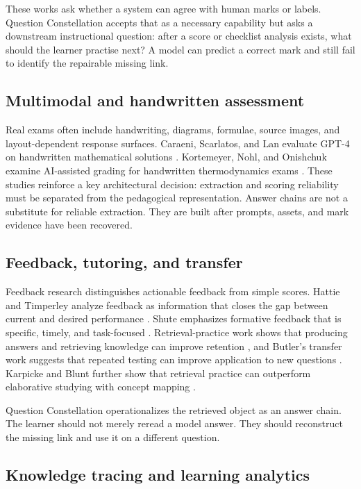 \documentclass[11pt]{article}
\begin{document}
These works ask whether a system can agree with human marks or labels. Question Constellation accepts that as a necessary capability but asks a downstream instructional question: after a score or checklist analysis exists, what should the learner practise next? A model can predict a correct mark and still fail to identify the repairable missing link.

\subsection{Multimodal and handwritten assessment}

Real exams often include handwriting, diagrams, formulae, source images, and layout-dependent response surfaces. Caraeni, Scarlatos, and Lan evaluate GPT-4 on handwritten mathematical solutions \cite{caraeni2024}. Kortemeyer, Nohl, and Onishchuk examine AI-assisted grading for handwritten thermodynamics exams \cite{kortemeyer2024}. These studies reinforce a key architectural decision: extraction and scoring reliability must be separated from the pedagogical representation. Answer chains are not a substitute for reliable extraction. They are built after prompts, assets, and mark evidence have been recovered.

\subsection{Feedback, tutoring, and transfer}

Feedback research distinguishes actionable feedback from simple scores. Hattie and Timperley analyze feedback as information that closes the gap between current and desired performance \cite{hattie2007}. Shute emphasizes formative feedback that is specific, timely, and task-focused \cite{shute2008}. Retrieval-practice work shows that producing answers and retrieving knowledge can improve retention \cite{roediger2006}, and Butler's transfer work suggests that repeated testing can improve application to new questions \cite{butler2010}. Karpicke and Blunt further show that retrieval practice can outperform elaborative studying with concept mapping \cite{karpicke2011}.

Question Constellation operationalizes the retrieved object as an answer chain. The learner should not merely reread a model answer. They should reconstruct the missing link and use it on a different question.

\subsection{Knowledge tracing and learning analytics}
\end{document}
